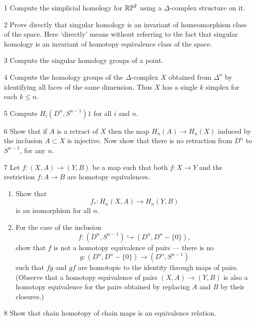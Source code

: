 \documentclass[12pt]{article}
\begin{document}


\begin{problem} {1}
    Compute the simplicial homology for $\mathbb{RP}^2$ using a $\Delta$-complex structure on it. 
\end{problem}

\begin{problem} {2}
    Prove directly that singular homology is an invariant of homeomorphism class of the space. Here `directly' means without referring to the fact that singular homology is an invariant of homotopy equivalence class of the space.
\end{problem}

\begin{problem}{3}
    Compute the singular homology groups of a point.
\end{problem}

\begin{problem} {4}
     Compute the homology groups of the $\Delta$-complex $X$ obtained from $\Delta^n$ by identifying all faces of the same dimension. Thus $X$ has a single $k$ simplex for each $k \leq n$.
\end{problem}

\begin{problem}{5}
    Compute $H_i(D^n, S^{n-1})1$ for all $i$ and $n$. 
\end{problem}

\begin{problem}{6}
    Show that if $A$ is a retract of $X$ then the map $H_n(A)\to H_n(X)$ induced by the inclusion $A \subset X$ is injective. Now show that there is no retraction from $D^n$ to $S^{n-1}$, for any $n$.
\end{problem}

\begin{problem}{7}
    Let $f : (X,A) \to (Y,B)$ be a map such that both $f : X \to Y$ and the restriction $f : A \to B$ are homotopy equivalences.

    \begin{enumerate}
        \item Show that
        \[
            f_* : H_n(X,A) \to H_n(Y,B)
        \]
        is an isomorphism for all $n$.

        \item For the case of the inclusion
        \[
            f : (D^n,S^{n-1}) \hookrightarrow (D^n,D^n-\{0\}),
        \]
        show that $f$ is not a homotopy equivalence of pairs --- there is no
        \[
            g : (D^n,D^n-\{0\}) \to (D^n,S^{n-1})
        \]
        such that $fg$ and $gf$ are homotopic to the identity through maps of pairs.
        (Observe that a homotopy equivalence of pairs $(X,A) \to (Y,B)$ is also a homotopy equivalence for the pairs obtained by replacing $A$ and $B$ by their closures.)
    \end{enumerate}
\end{problem}

\begin{problem}{8}
     Show that chain homotopy of chain maps is an equivalence relation.
\end{problem}
\end{document}
